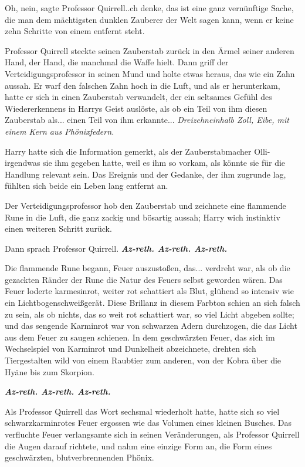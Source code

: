 \glqq{}Oh, nein\grqq{}, sagte Professor Quirrell.\grqq{}.ch denke, das ist eine
ganz vernünftige Sache, die man dem mächtigsten dunklen Zauberer der Welt sagen
kann, wenn er keine zehn Schritte von einem entfernt steht.\grqq{}

Professor Quirrell steckte seinen Zauberstab zurück in den Ärmel seiner anderen
Hand, der Hand, die manchmal die Waffe hielt. Dann griff der
Verteidigungsprofessor in seinen Mund und holte etwas heraus, das wie ein Zahn
aussah. Er warf den falschen Zahn hoch in die Luft, und als er herunterkam,
hatte er sich in einen Zauberstab verwandelt, der ein seltsames Gefühl des
Wiedererkennens in Harrys Geist auslöste, als ob ein Teil von ihm diesen
Zauberstab als... einen Teil von ihm erkannte... \emph{Dreizehneinhalb Zoll,
Eibe, mit einem Kern aus Phönixfedern.}

Harry hatte sich die Information gemerkt, als der Zauberstabmacher
Olli-irgendwas sie ihm gegeben hatte, weil es ihm so vorkam, als könnte sie für
die Handlung relevant sein. Das Ereignis und der Gedanke, der ihm zugrunde lag,
fühlten sich beide ein Leben lang entfernt an.

Der Verteidigungsprofessor hob den Zauberstab und zeichnete eine flammende Rune
in die Luft, die ganz zackig und bösartig aussah; Harry wich instinktiv einen
weiteren Schritt zurück.

Dann sprach Professor Quirrell. \glqq{}\textbf{\emph{Az-reth. Az-reth.
Az-reth.}}\grqq{}

Die flammende Rune begann, Feuer auszustoßen, das... verdreht war, als ob die
gezackten Ränder der Rune die Natur des Feuers selbst geworden wären. Das Feuer
loderte karmesinrot, weiter rot schattiert als Blut, glühend so intensiv wie ein
Lichtbogenschweißgerät. Diese Brillanz in diesem Farbton schien an sich falsch
zu sein, als ob nichts, das so weit rot schattiert war, so viel Licht abgeben
sollte; und das sengende Karminrot war von schwarzen Adern durchzogen, die das
Licht aus dem Feuer zu saugen schienen. In dem geschwärzten Feuer, das sich im
Wechselspiel von Karminrot und Dunkelheit abzeichnete, drehten sich
Tiergestalten wild von einem Raubtier zum anderen, von der Kobra über die Hyäne
bis zum Skorpion.

\glqq{}\textbf{\emph{Az-reth. Az-reth. Az-reth.}}\grqq{}

Als Professor Quirrell das Wort sechsmal wiederholt hatte, hatte sich so viel
schwarzkarminrotes Feuer ergossen wie das Volumen eines kleinen Busches. Das
verfluchte Feuer verlangsamte sich in seinen Veränderungen, als Professor
Quirrell die Augen darauf richtete, und nahm eine einzige Form an, die Form
eines geschwärzten, blutverbrennenden Phönix.

